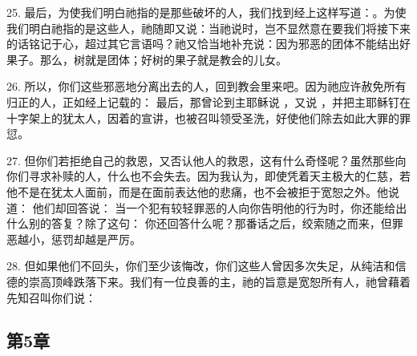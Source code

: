 25. 最后，为使我们明白祂指的是那些破坏的人，我们找到经上这样写道：。为使我们明白祂指的是这些人，祂随即又说：当祂说时，岂不显然意在要我们将接下来的话铭记于心，超过其它言语吗？祂又恰当地补充说：因为邪恶的团体不能结出好果子。那么，树就是团体；好树的果子就是教会的儿女。\par

26. 所以，你们这些邪恶地分离出去的人，回到教会里来吧。因为祂应许赦免所有归正的人，正如经上记载的：  最后，那曾论到主耶稣说 ，又说 ，并把主耶稣钉在十字架上的犹太人，因着的宣讲，也被召叫领受圣洗，好使他们除去如此大罪的罪愆。\par

27. 但你们若拒绝自己的救恩，又否认他人的救恩，这有什么奇怪呢？虽然那些向你们寻求补赎的人，什么也不会失去。因为我认为，即使凭着天主极大的仁慈，若他不是在犹太人面前，而是在面前表达他的悲痛，也不会被拒于宽恕之外。他说道：  他们却回答说： 当一个犯有较轻罪恶的人向你告明他的行为时，你还能给出什么别的答复？除了这句： 你还回答什么呢？那番话之后，绞索随之而来，但罪恶越小，惩罚却越是严厉。\par

28. 但如果他们不回头，你们至少该悔改，你们这些人曾因多次失足，从纯洁和信德的崇高顶峰跌落下来。我们有一位良善的主，祂的旨意是宽恕所有人，祂曾藉着先知召叫你们说：\par


\subsection{第5章}

\par

